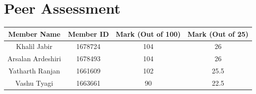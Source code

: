 \documentclass{article}
\begin{document}
\newpage
\section{Peer Assessment}
\begin{tabular}{| c | c | c | c |} 
 \hline
 Member Name  & Member ID & Mark (Out of 100) & Mark (Out of 25) \\ [0.5ex] 
 \hline\hline
 Khalil Jabir & 1678724 & 104 & 26\\
 \hline
 Arsalan Ardeshiri & 1678493 & 104  & 26 \\
 \hline
 Yatharth Ranjan & 1661609 & 102 & 25.5\\
 \hline
 Vashu Tyagi & 1663661 & 90 & 22.5 \\
\hline
\end{tabular}


\newpage
\end{document}
